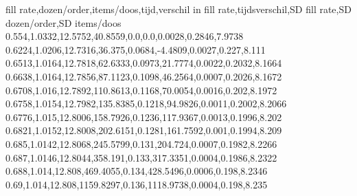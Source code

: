 fill rate,dozen/order,items/doos,tijd,verschil in fill rate,tijdsverschil,SD fill rate,SD dozen/order,SD items/doos
0.554,1.0332,12.5752,40.8559,0.0,0.0,0.0028,0.2846,7.9738
0.6224,1.0206,12.7316,36.375,0.0684,-4.4809,0.0027,0.227,8.111
0.6513,1.0164,12.7818,62.6333,0.0973,21.7774,0.0022,0.2032,8.1664
0.6638,1.0164,12.7856,87.1123,0.1098,46.2564,0.0007,0.2026,8.1672
0.6708,1.016,12.7892,110.8613,0.1168,70.0054,0.0016,0.202,8.1972
0.6758,1.0154,12.7982,135.8385,0.1218,94.9826,0.0011,0.2002,8.2066
0.6776,1.015,12.8006,158.7926,0.1236,117.9367,0.0013,0.1996,8.202
0.6821,1.0152,12.8008,202.6151,0.1281,161.7592,0.001,0.1994,8.209
0.685,1.0142,12.8068,245.5799,0.131,204.724,0.0007,0.1982,8.2266
0.687,1.0146,12.8044,358.191,0.133,317.3351,0.0004,0.1986,8.2322
0.688,1.014,12.808,469.4055,0.134,428.5496,0.0006,0.198,8.2346
0.69,1.014,12.808,1159.8297,0.136,1118.9738,0.0004,0.198,8.235
